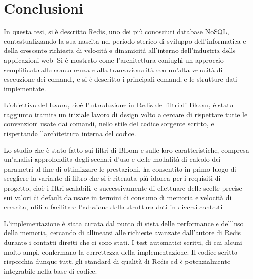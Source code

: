 \chapter{Conclusioni}

In questa tesi, si è descritto Redis, uno dei più conosciuti database NoSQL, contestualizzando la
sua nascita nel periodo storico di sviluppo dell'informatica e della crescente richiesta di velocità
e dinamicità all'interno dell'industria delle applicazioni web. Si è mostrato come l'architettura
coniughi un approccio semplificato alla concorrenza e alla transazionalità con un'alta velocità di
esecuzione dei comandi, e si è descritto i principali comandi e le strutture dati implementate.

L'obiettivo del lavoro, cioè l'introduzione in Redis dei filtri di Bloom, è stato raggiunto tramite
un iniziale lavoro di design volto a cercare di rispettare tutte le convenzioni usate dai comandi,
nello stile del codice sorgente scritto, e rispettando l'architettura interna del codice.

Lo studio che è stato fatto sui filtri di Bloom e sulle loro caratteristiche, compresa un'analisi
approfondita degli scenari d'uso e delle modalità di calcolo dei parametri al fine di ottimizzare le
prestazioni, ha consentito in primo luogo di scegliere la variante di filtro che si è ritenuta più
idonea per i requisiti di progetto, cioè i filtri scalabili, e successivamente di effettuare delle
scelte precise sui valori di default da usare in termini di consumo di memoria e velocità di
crescita, utili a facilitare l'adozione della struttura dati in diversi contesti.

L'implementazione è stata curata dal punto di vista delle performance e dell'uso della memoria,
cercando di allinearsi alle richieste avanzate dall'autore di Redis durante i contatti diretti che
ci sono stati. I test automatici scritti, di cui alcuni molto ampi, confermano la correttezza della
implementazione. Il codice scritto rispecchia dunque tutti gli standard di qualità di Redis ed è
potenzialmente integrabile nella base di codice.
